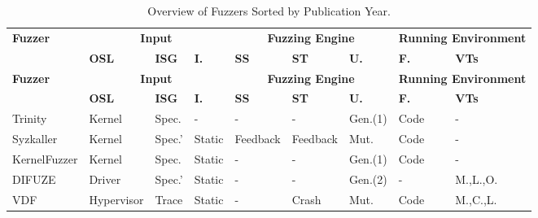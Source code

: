 \begin{footnotesize}
        \begin{longtable}{m{1.8cm}m{1.3cm}m{0.6cm}m{1.6cm}m{1.0cm}m{0.8cm}m{0.9cm}m{1.3cm}m{0.5cm}}
        \caption{Overview of Fuzzers Sorted by Publication Year.}\label{tab1} \vspace{-0.3cm}\\
        
        \toprule
        \multirow{2.5}{*}{\textbf{Fuzzer}} & \multicolumn{3}{c}{\textbf{Input}} & \multicolumn{3}{c}{\textbf{Fuzzing Engine}} & \multicolumn{2}{c}{\textbf{Running Environment}} \\
        \cmidrule(lr){2-4} \cmidrule(lr){5-7} \cmidrule(lr){8-9} & \textbf{OSL} & \textbf{ISG} & \textbf{I.} & \textbf{SS} & \textbf{ST} & \textbf{U.} & \textbf{F.} & \textbf{VTs} \\
        \midrule
        \endfirsthead
        
        \toprule
        \multirow{2.5}{*}{\textbf{Fuzzer}} & \multicolumn{3}{c}{\textbf{Input}} & \multicolumn{3}{c}{\textbf{Fuzzing Engine}} & \multicolumn{2}{c}{\textbf{Running Environment}} \\
        \cmidrule(lr){2-4} \cmidrule(lr){5-7} \cmidrule(lr){8-9} & \textbf{OSL} & \textbf{ISG} & \textbf{I.} & \textbf{SS} & \textbf{ST} & \textbf{U.} & \textbf{F.} & \textbf{VTs} \\
        \midrule
        \endhead
        
        \bottomrule
        \endfoot
        
        Trinity\cite{Trinity} & Kernel & Spec. & - & - & - & Gen.(1) & Code & -\\
        
        
        Syzkaller\cite{Syzkaller} & Kernel & Spec.' & Static & Feedback & Feedback & Mut. & Code & -\\
        
        KernelFuzzer\cite{KernelFuzzer2016} & Kernel & Spec. & Static & - & - & Gen.(1) & Code & -\\
        
        DIFUZE\cite{2017DIFUZE} & Driver & Spec.' & Static & - & - & Gen.(2) & - & M.,L.,O. \\
        
        VDF\cite{henderson2017vdf} & Hypervisor & Trace & Static & - & Crash & Mut. & Code & M.,C.,L. \\
        

\end{longtable}
\end{footnotesize}

